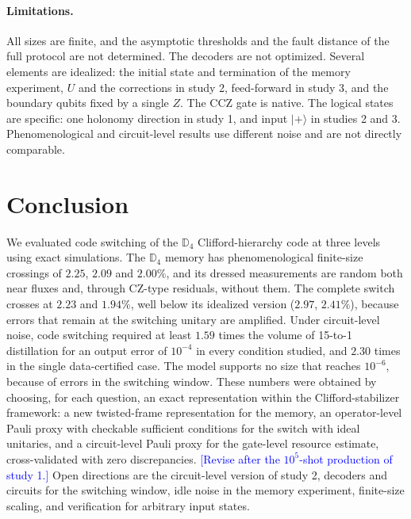 \documentclass[a4paper]{article}
\newcommand{\blue}[1]{\textcolor{blue}{#1}}
\providecommand{\ket}[1]{\ensuremath{|#1\rangle}}
\begin{document}
\paragraph{Limitations.}
All sizes are finite, and the asymptotic thresholds and the fault distance of the full protocol are not determined. The decoders are not optimized. Several elements are idealized: the initial state and termination of the memory experiment, $U$ and the corrections in study 2, feed-forward in study 3, and the boundary qubits fixed by a single $Z$. The CCZ gate is native. The logical states are specific: one holonomy direction in study 1, and input $\ket{+}$ in studies 2 and 3. Phenomenological and circuit-level results use different noise and are not directly comparable.

\section{Conclusion}
\label{sec:conclusion}

We evaluated code switching of the $\mathbb{D}_4$ Clifford-hierarchy code at three levels using exact simulations. The $\mathbb{D}_4$ memory has phenomenological finite-size crossings of $2.25$, $2.09$ and $2.00\%$, and its dressed measurements are random both near fluxes and, through CZ-type residuals, without them. The complete switch crosses at $2.23$ and $1.94\%$, well below its idealized version ($2.97$, $2.41\%$), because errors that remain at the switching unitary are amplified. Under circuit-level noise, code switching required at least $1.59$ times the volume of 15-to-1 distillation for an output error of $10^{-4}$ in every condition studied, and $2.30$ times in the single data-certified case. The model supports no size that reaches $10^{-6}$, because of errors in the switching window. These numbers were obtained by choosing, for each question, an exact representation within the Clifford-stabilizer framework: a new twisted-frame representation for the memory, an operator-level Pauli proxy with checkable sufficient conditions for the switch with ideal unitaries, and a circuit-level Pauli proxy for the gate-level resource estimate, cross-validated with zero discrepancies. \blue{[Revise after the $10^5$-shot production of study 1.]} Open directions are the circuit-level version of study 2, decoders and circuits for the switching window, idle noise in the memory experiment, finite-size scaling, and verification for arbitrary input states.
\end{document}
